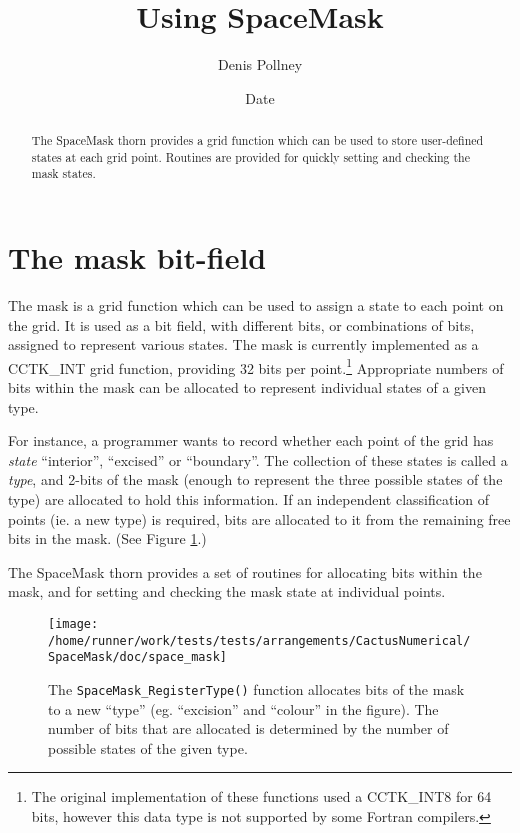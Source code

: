 \documentclass{article}
\begin{document}
\title{Using SpaceMask}
\author{Denis Pollney}
\date{$ $Date$ $}

\maketitle


\begin{abstract}
The SpaceMask thorn provides a grid function which can be used to
store user-defined states at each grid point. Routines are provided
for quickly setting and checking the mask states.
\end{abstract}

\section{The mask bit-field}

The mask is a grid function which can be used to assign a state to
each point on the grid. It is used as a bit field, with different
bits, or combinations of bits, assigned to represent various states.
The mask is currently implemented as a CCTK\_INT grid function,
providing 32 bits per point.\footnote{The original implementation of
these functions used a CCTK\_INT8 for 64 bits, however this data type
is not supported by some Fortran compilers.} Appropriate numbers of
bits within the mask can be allocated to represent individual states
of a given type.

For instance, a programmer wants to record whether each point of the
grid has \emph{state} ``interior'', ``excised'' or ``boundary''. The
collection of these states is called a \emph{type}, and 2-bits of the
mask (enough to represent the three possible states of the type) are
allocated to hold this information. If an independent classification
of points (ie. a new type) is required, bits are allocated to it from
the remaining free bits in the mask. (See Figure \ref{fig:mask_bits}.)

The SpaceMask thorn provides a set of routines for allocating bits
within the mask, and for setting and checking the mask state at
individual points.

\begin{figure}
  \centering
  \texttt{[image: /home/runner/work/tests/tests/arrangements/CactusNumerical/SpaceMask/doc/space\_mask]}
  \caption{The \texttt{SpaceMask\_RegisterType()} function allocates
  bits of the mask to a new ``type'' (eg. ``excision'' and ``colour''
  in the figure). The number of bits that are allocated is determined
  by the number of possible states of the given type.}
  \label{fig:mask_bits}
\end{figure}
\end{document}
